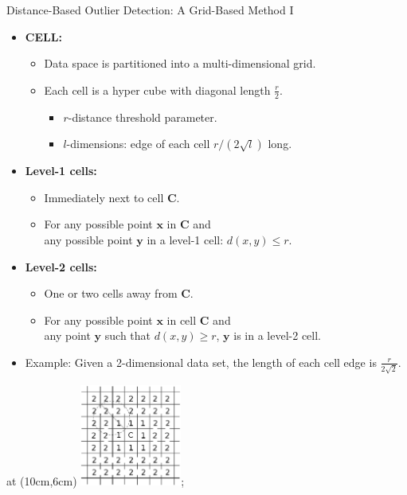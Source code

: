\begin{frame}{Distance-Based Outlier Detection: A Grid-Based Method I}
	\begin{itemize}
		\item \textbf{CELL:}
		      \begin{itemize}
			      \item Data space is partitioned into a multi-dimensional grid.
			      \item Each cell is a hyper cube with diagonal length $\frac{r}{2}$.
			            \begin{itemize}
				            \item $r$-distance threshold parameter.
				            \item $l$-dimensions: edge of each cell $r / (2\sqrt{l})$ long.
			            \end{itemize}
		      \end{itemize}
		\item \textbf{Level-1 cells:}
		      \begin{itemize}
			      \item Immediately next to cell $\mathbf{C}$.
			      \item For any possible point $\mathbf{x}$ in $\mathbf{C}$ and \\
			            any possible point $\mathbf{y}$ in a level-1 cell: $d(x,y) \leq r$.
		      \end{itemize}
		\item \textbf{Level-2 cells:}
		      \begin{itemize}
			      \item One or two cells away from $\mathbf{C}$.
			      \item For any possible point $\mathbf{x}$ in cell $\mathbf{C}$ and \\
			            any point $\mathbf{y}$ such that $d(x,y) \geq r$, $\mathbf{y}$ is in a level-2 cell.
		      \end{itemize}
		\item Example: Given a 2-dimensional data set, the length of each cell edge is $\frac{r}{2\sqrt{2}}$.
	\end{itemize}
	\tikzoverlay at (10cm,6cm) {\includegraphics[width=0.25\textwidth]{img/grid8.png}};
\end{frame}



